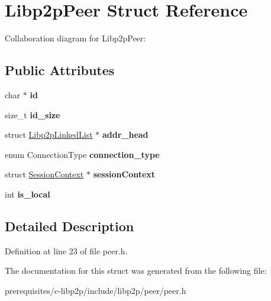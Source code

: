 \hypertarget{struct_libp2p_peer}{}\section{Libp2p\+Peer Struct Reference}
\label{struct_libp2p_peer}


Collaboration diagram for Libp2p\+Peer\+:
\subsection*{Public Attributes}
\begin{DoxyCompactItemize}
\item 
\mbox{\label{struct_libp2p_peer_a84c807efb08a302a5ca75f36a22cda24}} 
char $\ast$ {\bfseries id}
\item 
\mbox{\label{struct_libp2p_peer_af737ded318a283e6b5366a2579688792}} 
size\+\_\+t {\bfseries id\+\_\+size}
\item 
\mbox{\label{struct_libp2p_peer_afec8af897c90ae412bdd2f0d1ca59d96}} 
struct \mbox{\hyperlink{struct_libp2p_linked_list}{Libp2p\+Linked\+List}} $\ast$ {\bfseries addr\+\_\+head}
\item 
\mbox{\label{struct_libp2p_peer_a40337f72de3dd557ed6c1fef9991baf3}} 
enum Connection\+Type {\bfseries connection\+\_\+type}
\item 
\mbox{\label{struct_libp2p_peer_a7dde7780fff2f5ba464047f089f5e281}} 
struct \mbox{\hyperlink{struct_session_context}{Session\+Context}} $\ast$ {\bfseries session\+Context}
\item 
\mbox{\label{struct_libp2p_peer_a966cbbf9ea5c23955d5524d97f4b40b9}} 
int {\bfseries is\+\_\+local}
\end{DoxyCompactItemize}


\subsection{Detailed Description}


Definition at line 23 of file peer.\+h.



The documentation for this struct was generated from the following file\+:\begin{DoxyCompactItemize}
\item 
prerequisites/c-\/libp2p/include/libp2p/peer/peer.\+h\end{DoxyCompactItemize}
